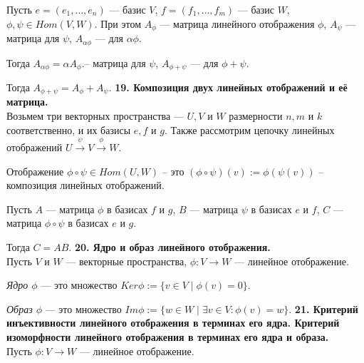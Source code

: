 \documentclass{article}
\begin{document}
Пусть $e = (e_1, \ldots, e_n)$ --- базис $V$, $f= (f_1, \ldots, f_m)$ --- базис $W$, $\phi, \psi \in Hom(V, W)$. При этом $A_{\phi}$ --- матрица линейного отображения $\phi$, $A_{\psi}$ --- матрица для $\psi$,  $A_{\alpha\phi}$ --- для $\alpha\phi$.

Тогда $A_{\alpha\phi} = \alpha A_{\phi}$.-- матрица для $\psi$, $A_{\phi+\psi}$ --- для $\phi + \psi$.

Тогда $A_{\phi+\psi} = A_{\phi} + A_{\psi}$.
\newline
\newline
\textbf{19. Композиция двух линейных отображений и её матрица.}\\
Возьмем три векторных пространства --- $U, V$ и $W$ размерности $n, m$ и $k$ соответственно, и их базисы $e, f$ и $g$. Также рассмотрим цепочку линейных отображений $U \xrightarrow{\psi} V \xrightarrow{\phi} W$. 

Отображение $\phi\circ\psi \in Hom(U, W)$ -- это $(\phi\circ\psi)(v) := \phi(\psi(v))$ -- композиция линейных отображений.

Пусть $A$ --- матрица $\phi$ в базисах $f$ и $g$, $B$ --- матрица $\psi$ в базисах $e$ и $f$, $C$ --- матрица $\phi\circ\psi$ в базисах $e$ и $g$.

Тогда $C = AB$.
\newline
\newline
\textbf{20. Ядро и образ линейного отображения.}\\
Пусть $V$ и $W$ --- векторные пространства, $\phi: V \rightarrow W$ --- линейное отображение.

\textit{Ядро $\phi$} --- это множество $Ker\phi := \{v \in V \mid \phi(v) = 0 \}$.

\textit{Образ $\phi$} --- это множество $Im \phi := \{w \in W \mid \exists v \in V : \phi(v) = w \}$.
\newline
\newline
\textbf{21. Критерий инъективности линейного отображения в терминах его ядра. Критерий изоморфности линейного
отображения в терминах его ядра и образа.}\\
Пусть $\phi\colon V \rightarrow W$ --- линейное отображение.
\end{document}

